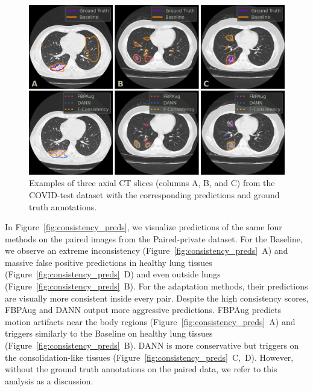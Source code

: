\begin{figure}[h]
	\centering
	\includegraphics[width=\textwidth]{Dissertation/Figures/3_ct/test_preds.png}
	\caption{Examples of three axial CT slices (columns A, B, and C) from the COVID-test dataset with the corresponding predictions and ground truth annotations.}%
	\label{fig:test_preds}
\end{figure}

In Figure~\ref{fig:consistency_preds}, we visualize predictions of the same four methods on the paired images from the Paired-private dataset. For the Baseline, we observe an extreme inconsistency (Figure~\ref{fig:consistency_preds}~A) and massive false positive predictions in healthy lung tissues (Figure~\ref{fig:consistency_preds}~D) and even outside lungs (Figure~\ref{fig:consistency_preds}~B). For the adaptation methods, their predictions are visually more consistent inside every pair. Despite the high consistency scores, FBPAug and DANN output more aggressive predictions. FBPAug predicts motion artifacts near the body regions (Figure~\ref{fig:consistency_preds}~A) and triggers similarly to the Baseline on healthy lung tissues (Figure~\ref{fig:consistency_preds}~B). DANN is more conservative but triggers on the consolidation-like tissues (Figure~\ref{fig:consistency_preds}~C,~D). However, without the ground truth annotations on the paired data, we refer to this analysis as a discussion.

